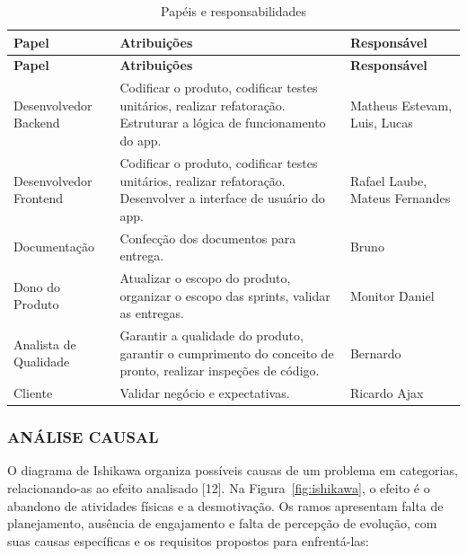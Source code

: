 \begingroup
\small
\setlength{\tabcolsep}{4pt}
\renewcommand{\arraystretch}{1.2}
\begin{longtable}{|>{\raggedright\arraybackslash}p{}|>{\raggedright\arraybackslash}p{}|>{\raggedright\arraybackslash}p{}|}
\caption{Papéis e responsabilidades}\\
\hline
\textbf{Papel} & \textbf{Atribuições} & \textbf{Responsável} \\ \hline
\endfirsthead
\textbf{Papel} & \textbf{Atribuições} & \textbf{Responsável} \\ \hline
\endhead
Desenvolvedor Backend & Codificar o produto, codificar testes unitários, realizar refatoração. Estruturar a lógica de funcionamento do app. & Matheus Estevam, Luis, Lucas \\ \hline
Desenvolvedor Frontend & Codificar o produto, codificar testes unitários, realizar refatoração. Desenvolver a interface de usuário do app. & Rafael Laube, Mateus Fernandes \\ \hline
Documentação & Confecção dos documentos para entrega. & Bruno \\ \hline
Dono do Produto & Atualizar o escopo do produto, organizar o escopo das sprints, validar as entregas. & Monitor Daniel \\ \hline
Analista de Qualidade & Garantir a qualidade do produto, garantir o cumprimento do conceito de pronto, realizar inspeções de código. & Bernardo \\ \hline
Cliente & Validar negócio e expectativas. & Ricardo Ajax \\ \hline
\end{longtable}
\endgroup

\subsubsection{ANÁLISE CAUSAL}

O diagrama de Ishikawa organiza possíveis causas de um problema em categorias, relacionando-as ao efeito analisado [12]. Na Figura~\ref{fig:ishikawa}, o efeito é o abandono de atividades físicas e a desmotivação. Os ramos apresentam falta de planejamento, ausência de engajamento e falta de percepção de evolução, com suas causas específicas e os requisitos propostos para enfrentá-las:

